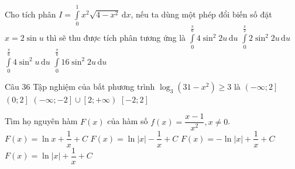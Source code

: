 \begin{ex}%
Cho tích phân $I=\displaystyle\int\limits_0^1 x^2\sqrt{4-x^2} \mathrm{\,d}x$, nếu ta dùng một phép đổi biến số đặt $x=2\sin u$ thì sẽ thu được tích phân tương ứng là
\choice
{\True $\displaystyle\int\limits_0^{\frac{\pi}{6}} 4\sin^2 2u \mathrm{\,d}u$}
{$\displaystyle\int\limits_0^{\frac{\pi}{2}} 2\sin^2 2u \mathrm{\,d}u$}
{$\displaystyle\int\limits_0^{\frac{\pi}{6}} 4\sin^2 u \mathrm{\,d}u$}
{$\displaystyle\int\limits_0^{\frac{\pi}{6}} 16\sin^2 2u \mathrm{\,d}u$}
\end{ex}

\begin{ex}Câu 36%
Tập nghiệm của bất phương trình ${{\log }_{3}}\left( 31-{{x}^{2}} \right)\ge 3$ là
\choice
{$\left( -\infty ;2 \right]$}
{$\left( 0;2 \right]$}
{$\left( -\infty ;-2 \right]\cup \left[ 2;+\infty  \right)$}
{\True $\left[ -2;2 \right]$}
\end{ex}

\begin{ex}%
Tìm họ nguyên hàm $F(x)$ của hàm số $f(x)=\dfrac{x-1}{x^2},x\ne 0$.
\choice
{$F(x)=\ln x+\dfrac{1}{x}+C$}
{$F(x)=\ln |x|-\dfrac{1}{x}+C$}
{$F(x)=-\ln |x|+\dfrac{1}{x}+C$}
{\True $F(x)=\ln |x|+\dfrac{1}{x}+C$}
\end{ex}

